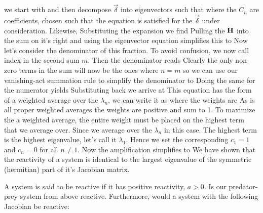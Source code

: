 \solution 
we start with 
and then decompose $\vec{\delta}$ into eigenvectors such that 
where the $C_n$ are coefficients, chosen such that the equation is satisfied for the $\vec{\delta}$ under consideration. Likewise, 
Substituting the expansion we find 
Pulling the $\bf H$ into the sum on it's right and using the eigenvector equation simplifies this to 
Now let's consider the denominator of this fraction. To avoid confusion, we now call index in the second sum $m$. Then the denominator reads
Clearly the only non-zero terms in the sum will now be the ones where $n=m$ so we can use our vanishing-act summation rule to simplify the denominator to 
Doing the same for the numerator yields 
Substituting back we arrive at 
This equation has the form of a weighted average over the $\lambda_n$, we can write it as 
where the weights are 
As is all proper weighted averages the weights are positive and sum to 1.  To maximize the a weighted average, the entire weight must be placed on the highest term that we average over. Since we average over the $\lambda_n$ in this case. The highest term is the highest eigenvalue, let's call it $\lambda_1$. Hence we set the corresponding $c_1=1$ and $c_n=0$ for all $n\neq 1$. Now the amplification simplifies to  
We have shown that the reactivity of a system is identical to the largest eigenvalue of the symmetric (hermitian) part of it's Jacobian matrix. 

\subquestion
A system is said to be reactive if it has positive reactivity, $a>0$. Is our predator-prey system from above reactive. Furthermore, would a system with the following Jacobian be reactive:

